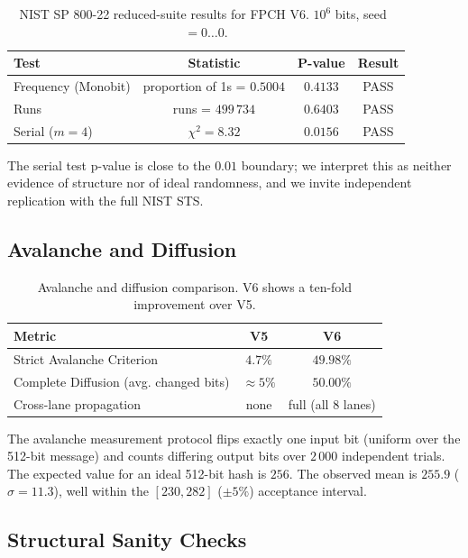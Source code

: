 \documentclass[11pt,a4paper]{article}
\theoremstyle{plain}
\theoremstyle{definition}
\theoremstyle{remark}
\begin{document}
\begin{table}[h]
\centering
\small
\begin{tabular}{lccc}
\toprule
Test & Statistic & P-value & Result \\
\midrule
Frequency (Monobit) & proportion of 1s = $0.5004$ & $0.4133$ & PASS \\
Runs & runs = $499\,734$ & $0.6403$ & PASS \\
Serial ($m=4$) & $\chi^2 = 8.32$ & $0.0156$ & PASS \\
\bottomrule
\end{tabular}
\caption{NIST SP 800-22 reduced-suite results for FPCH V6. $10^6$ bits, seed~$=0\dots0$.}
\label{tab:nist}
\end{table}

The serial test p-value is close to the $0.01$ boundary; we interpret this as neither evidence of structure nor of ideal randomness, and we invite independent replication with the full NIST STS.

\subsection{Avalanche and Diffusion}

\begin{table}[h]
\centering
\small
\begin{tabular}{lcc}
\toprule
Metric & V5 & V6 \\
\midrule
Strict Avalanche Criterion & $4.7\%$ & $\mathbf{49.98\%}$ \\
Complete Diffusion (avg. changed bits) & $\approx 5\%$ & $\mathbf{50.00\%}$ \\
Cross-lane propagation & none & full (all 8 lanes) \\
\bottomrule
\end{tabular}
\caption{Avalanche and diffusion comparison. V6 shows a ten-fold improvement over V5.}
\label{tab:avalanche}
\end{table}

The avalanche measurement protocol flips exactly one input bit (uniform over the 512-bit message) and counts differing output bits over $2\,000$ independent trials. The expected value for an ideal 512-bit hash is $256$. The observed mean is $255.9$ ($\sigma = 11.3$), well within the $[230,282]$ ($\pm 5\%$) acceptance interval.

\subsection{Structural Sanity Checks}
\end{document}
